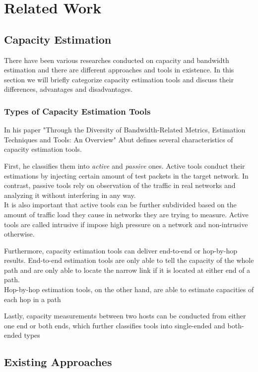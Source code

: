\chapter{Related Work}

\section{Capacity Estimation}

There have been various researches conducted on capacity and bandwidth estimation and there are different approaches and tools in existence.  In this section we will briefly categorize capacity estimation tools and discuss their differences, advantages and disadvantages.


\subsection{Types of Capacity Estimation Tools}
In his paper "Through the Diversity of Bandwidth-Related Metrics, Estimation Techniques and Tools: An Overview" Abut\cite{Abut2018} defines several characteristics of capacity estimation tools. 

First, he classifies them into \textit{active} and \textit{passive} ones. Active tools conduct their estimations by injecting certain amount of test packets in the target network. In contrast, passive tools rely on observation of the traffic in real networks and analyzing it without interfering in any way. \\
It is also important that active tools can be further subdivided based on the amount of traffic load they cause in networks they are trying to measure. Active tools are called intrusive if impose high pressure on a network and non-intrusive otherwise. 

Furthermore, capacity estimation tools can deliver end-to-end or hop-by-hop results. End-to-end estimation tools are only able to tell the capacity of the whole path and are only able to locate the narrow link if it is located at either end of a path.\\
Hop-by-hop estimation tools, on the other hand, are able to estimate capacities of each hop in a path\cite{Abut2018}

Lastly, capacity measurements between two hosts can be conducted from either one end or both ends, which further classifies tools into single-ended and both-ended types\cite{Abut2018}

\section{Existing Approaches}

